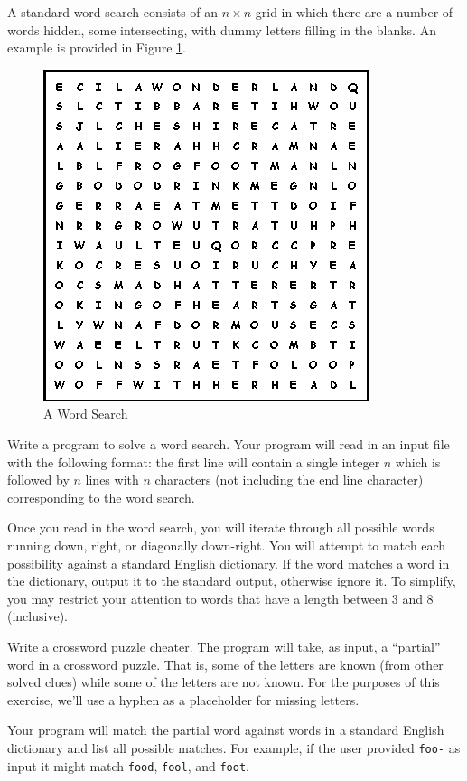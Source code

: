 \begin{exer}
A standard word search consists of an $n \times n$ grid in which there 
are a number of words hidden, some intersecting, with dummy letters 
filling in the blanks.  An example is provided in Figure \ref{fig:wordSearch}.

\begin{figure}[h]
\centering
\includegraphics[scale=0.40]{images/wordSearch}
\caption{A Word Search}
\label{fig:wordSearch}
\end{figure}

Write a program to solve a word search.  Your program will read in
an input file with the following format: the first line will contain a 
single integer $n$ which is followed by $n$ lines with $n$ characters 
(not including the end line character) corresponding to the word search.

Once you read in the word search, you will iterate through all possible 
words running down, right, or diagonally down-right.  You will attempt 
to match each possibility against a standard English dictionary.
If the word matches a word in the dictionary, output it to the standard 
output, otherwise ignore it.  To simplify, you may restrict your attention 
to words that have a length between 3 and 8 (inclusive).
\end{exer}

\begin{exer}
Write a crossword puzzle cheater.  The program will take, as input, 
a ``partial'' word in a crossword puzzle.  That is, some of the letters
are known (from other solved clues) while some of the letters are 
not known.  For the purposes of this exercise, we'll use a hyphen 
as a placeholder for missing letters.  

Your program will match the partial word against words in a standard
English dictionary and list all possible matches.  For example, if the 
user provided \texttt{foo-} as input it might match 
\texttt{food}, \texttt{fool}, and \texttt{foot}.  
\end{exer}


